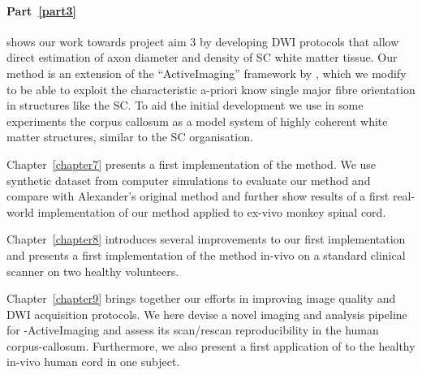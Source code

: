 \paragraph{Part~\ref{part3}} shows our work towards project aim 3 by developing \gls{DWI} protocols that allow direct estimation of axon diameter and density of SC white matter tissue. Our {\SF} method is an extension of the ``ActiveImaging'' framework by \citet{Alexander:2010}, which we modify to be able to exploit the characteristic a-priori know single major fibre orientation in structures like the \gls{SC}. To aid the initial development we use in some experiments the corpus callosum as a model system of highly coherent white matter structures, similar to the \gls{SC} organisation.

Chapter~\ref{chapter7} presents a first implementation of the {\SF} method. We use synthetic dataset from computer simulations to evaluate our method and compare with Alexander's original method and further show results of a first real-world implementation of our method applied to ex-vivo monkey spinal cord.

Chapter~\ref{chapter8} introduces several improvements to our first {\SF} implementation and presents a first implementation of the {\SF} method in-vivo on a standard clinical scanner on two healthy volunteers. 

Chapter~\ref{chapter9} brings together our efforts in improving image quality and \gls{DWI} acquisition protocols. We here devise a novel imaging and analysis pipeline for  {\SF}-ActiveImaging and assess its scan/rescan reproducibility in the human corpus-callosum. Furthermore, we also present a first application of {\SF} to the healthy in-vivo human cord in one subject.

